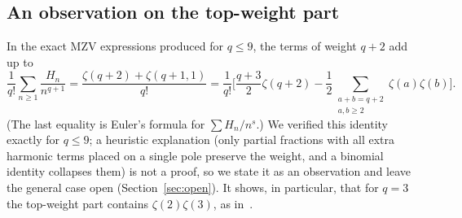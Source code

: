\subsection{An observation on the top-weight part}
In the exact MZV expressions produced for $q\le9$, the terms of weight $q+2$ add up to
\[
\frac1{q!}\sum_{n\ge1}\frac{H_n}{n^{q+1}}=\frac{\zeta(q+2)+\zeta(q+1,1)}{q!}=\frac1{q!}\Big[\frac{q+3}2\zeta(q+2)-\frac12\sum_{\substack{a+b=q+2\\a,b\ge2}}\zeta(a)\zeta(b)\Big].
\]
(The last equality is Euler's formula for $\sum H_n/n^s$.) We verified this identity exactly for $q\le9$; a heuristic explanation (only partial fractions with all extra harmonic terms placed on a single pole preserve the weight, and a binomial identity collapses them) is not a proof, so we state it as an observation and leave the general case open (Section~\ref{sec:open}). It shows, in particular, that for $q=3$ the top-weight part contains $\zeta(2)\zeta(3)$, as in~\cite{CN}.
